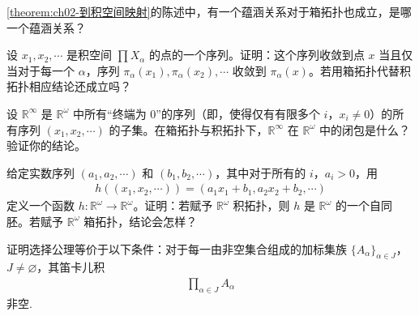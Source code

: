 \documentclass[../../main.tex]{subfiles}
\begin{document}
\begin{exercise}\label{exercise:ch02-积拓扑-5}
\cref{theorem:ch02-到积空间映射}的陈述中，有一个蕴涵关系对于箱拓扑也成立，是哪一个蕴涵关系？
\end{exercise}

\begin{exercise}\label{exercise:ch02-积拓扑-6}
设 $x_{1}, x_{2}, \cdots$ 是积空间 $\prod X_{\alpha}$ 的点的一个序列。证明：这个序列收敛到点 $x$ 当且仅当对于每一个 $\alpha$，序列 $\pi_{\alpha}(x_{1}), \pi_{\alpha}(x_{2}), \cdots$ 收敛到 $\pi_{\alpha}(x)$。若用箱拓扑代替积拓扑相应结论还成立吗？
\end{exercise}

\begin{exercise}\label{exercise:ch02-积拓扑-7}
设 $\mathbb{R}^{\infty}$ 是 $\mathbb{R}^{\omega}$ 中所有“终端为 0”的序列（即，使得仅有有限多个 $i$，$x_{i} \neq 0$）的所有序列 $(x_{1}, x_{2}, \cdots)$ 的子集。在箱拓扑与积拓扑下，$\mathbb{R}^{\infty}$ 在 $\mathbb{R}^{\omega}$ 中的闭包是什么？验证你的结论。
\end{exercise}

\begin{exercise}\label{exercise:ch02-积拓扑-8}
给定实数序列 $(a_{1}, a_{2}, \cdots)$ 和 $(b_{1}, b_{2}, \cdots)$，其中对于所有的 $i$，$a_{i} > 0$，用
\begin{align*}
h((x_{1}, x_{2}, \cdots)) = (a_{1}x_{1} + b_{1}, a_{2}x_{2} + b_{2}, \cdots)
\end{align*}
定义一个函数 $h: \mathbb{R}^{\omega} \rightarrow \mathbb{R}^{\omega}$。证明：若赋予 $\mathbb{R}^{\omega}$ 积拓扑，则 $h$ 是 $\mathbb{R}^{\omega}$ 的一个自同胚。若赋予 $\mathbb{R}^{\omega}$ 箱拓扑，结论会怎样？
\end{exercise}

\begin{exercise}\label{exercise:ch02-积拓扑-9}
证明选择公理等价于以下条件：对于每一由非空集合组成的加标集族 $\{A_{\alpha}\}_{\alpha \in J}$，$J \neq \varnothing$，其笛卡儿积
\begin{align*}
\prod_{\alpha \in J} A_{\alpha}
\end{align*}
非空.
\end{exercise}
\end{document}
